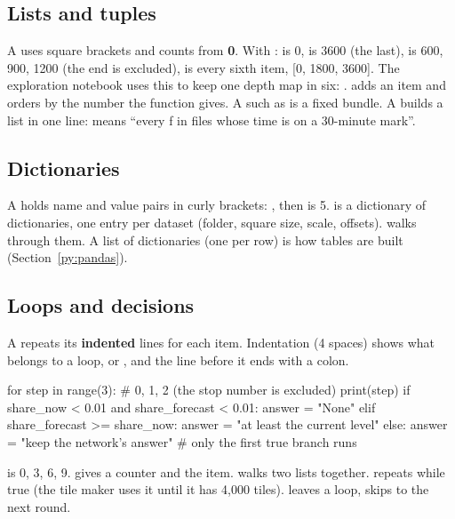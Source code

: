 \subsection{Lists and tuples}\label{py:lists}
A  uses square brackets and counts from \textbf{0}. With :  is 0,  is 3600 (the last),  is 600, 900, 1200 (the end is excluded),  is every sixth item, [0, 1800, 3600]. The exploration notebook uses this to keep one depth map in six: .  adds an item and  orders by the number the function gives. A  such as  is a fixed bundle. A  builds a list in one line: \cd{[f for f in files if get\_seconds(f) \% 1800 == 0]} means ``every f in files whose time is on a 30-minute mark''.

\subsection{Dictionaries}\label{py:dicts}
A  holds name and value pairs in curly brackets: , then  is 5.  is a dictionary of dictionaries, one entry per dataset (folder, square size, scale, offsets).  walks through them. A list of dictionaries (one per row) is how tables are built (Section~\ref{py:pandas}).

\subsection{Loops and decisions}\label{py:loops}
A  repeats its \textbf{indented} lines for each item. Indentation (4 spaces) shows what belongs to a loop,  or , and the line before it ends with a colon.
\begin{pycode}
for step in range(3):                 # 0, 1, 2 (the stop number is excluded)
    print(step)
if share_now < 0.01 and share_forecast < 0.01:
    answer = "None"
elif share_forecast >= share_now:
    answer = "at least the current level"
else:
    answer = "keep the network's answer"    # only the first true branch runs
\end{pycode}
 is 0, 3, 6, 9.  gives a counter and the item.  walks two lists together.  repeats while true (the tile maker uses it until it has 4,000 tiles).  leaves a loop,  skips to the next round.

